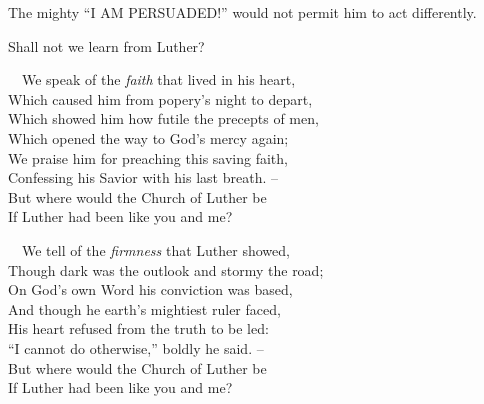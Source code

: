 \documentclass[
]{book}
\begin{document}
The mighty ``I AM PERSUADED!'' would not permit him to act differently.

Shall not we learn from Luther?

~~We speak of the \emph{faith} that lived in his heart,\\
\hspace*{0.333em}\hspace*{0.333em}Which caused him from popery's night to depart,\\
\hspace*{0.333em}\hspace*{0.333em}Which showed him how futile the precepts of men,\\
\hspace*{0.333em}\hspace*{0.333em}Which opened the way to God's mercy again;\\
\hspace*{0.333em}\hspace*{0.333em}We praise him for preaching this saving faith,\\
\hspace*{0.333em}\hspace*{0.333em}Confessing his Savior with his last breath. --\\
\hspace*{0.333em}\hspace*{0.333em}But where would the Church of Luther be\\
\hspace*{0.333em}\hspace*{0.333em}If Luther had been like you and me?

~~We tell of the \emph{firmness} that Luther showed,\\
\hspace*{0.333em}\hspace*{0.333em}Though dark was the outlook and stormy the road;\\
\hspace*{0.333em}\hspace*{0.333em}On God's own Word his conviction was based,\\
\hspace*{0.333em}\hspace*{0.333em}And though he earth's mightiest ruler faced,\\
\hspace*{0.333em}\hspace*{0.333em}His heart refused from the truth to be led:\\
\hspace*{0.333em}\hspace*{0.333em}``I cannot do otherwise,'' boldly he said. --\\
\hspace*{0.333em}\hspace*{0.333em}But where would the Church of Luther be\\
\hspace*{0.333em}\hspace*{0.333em}If Luther had been like you and me?
\end{document}

